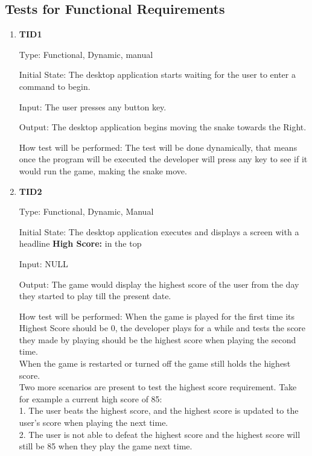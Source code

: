 \documentclass[12pt, titlepage]{article}
\begin{document}
\subsection{Tests for Functional Requirements}
		
\begin{enumerate}

\subsubsection{Testing Functions \& Methods}
\item{\textbf{TID1}\\}

Type: Functional, Dynamic, manual 			
		
Initial State: The desktop application starts waiting for the user to enter a command to begin.
					
Input: The user presses any button key.
					
Output: The desktop application begins moving the snake towards the Right.
					
How test will be performed: The test will be done dynamically, that means once the program will be executed the developer will press any key to see if it would run the game, making the snake move.



\item{\textbf{TID2}\\}

Type: Functional, Dynamic, Manual
					
Initial State: The desktop application executes and displays a screen with a headline \textbf{High Score:}  in the top
					
Input: NULL

Output: The game would display the highest score of the user from the day they started to play till the present date.
					
How test will be performed: When the game is played for the first time its Highest Score should be 0, the developer plays for a while and tests the score they made by playing should be the highest score when playing the second time.\\
When the game is restarted or turned off the game still holds the highest score.\\
Two more scenarios are present to test the highest score requirement. Take for example a current high score of 85:\\
1. The user beats the highest score, and the highest score is updated to the user's score when playing the next time.\\
2. The user is not able to defeat the highest score and the highest score will still be 85 when they play the game next time.



\end{enumerate}
\end{document}
